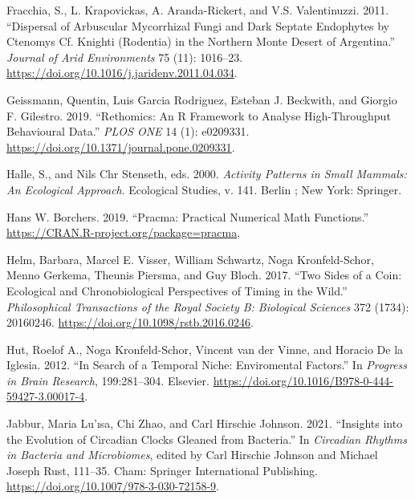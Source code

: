 \documentclass[msc,numbers,hidelinks]{coppe}
\newlength{\cslhangindent}
\newenvironment{CSLReferences}[2] %
 {%
  \setlength{\parindent}{0pt}
  \ifodd #1 \everypar{\setlength{\hangindent}{\cslhangindent}}\ignorespaces\fi
  \ifnum #2 > 0
  \setlength{\parskip}{#2\baselineskip}
  \fi
 }%
 {}
\begin{document}
\begin{CSLReferences}{1}{0}
  \leavevmode{}%
  Fracchia, S., L. Krapovickas, A. Aranda-Rickert, and V.S. Valentinuzzi. 2011. {``Dispersal of Arbuscular Mycorrhizal Fungi and Dark Septate Endophytes by Ctenomys Cf. Knighti (Rodentia) in the Northern Monte Desert of Argentina.''} \emph{Journal of Arid Environments} 75 (11): 1016--23. \url{https://doi.org/10.1016/j.jaridenv.2011.04.034}.

  \leavevmode{}%
  Geissmann, Quentin, Luis Garcia Rodriguez, Esteban J. Beckwith, and Giorgio F. Gilestro. 2019. {``Rethomics: An {R} Framework to Analyse High-Throughput Behavioural Data.''} \emph{PLOS ONE} 14 (1): e0209331. \url{https://doi.org/10.1371/journal.pone.0209331}.

  \leavevmode{}%
  Halle, S., and Nils Chr Stenseth, eds. 2000. \emph{Activity Patterns in Small Mammals: An Ecological Approach}. Ecological Studies, v. 141. {Berlin ; New York}: {Springer}.

  \leavevmode{}%
  Hans W. Borchers. 2019. {``Pracma: Practical Numerical Math Functions.''} \url{https://CRAN.R-project.org/package=pracma}.

  \leavevmode{}%
  Helm, Barbara, Marcel E. Visser, William Schwartz, Noga Kronfeld-Schor, Menno Gerkema, Theunis Piersma, and Guy Bloch. 2017. {``Two Sides of a Coin: Ecological and Chronobiological Perspectives of Timing in the Wild.''} \emph{Philosophical Transactions of the Royal Society B: Biological Sciences} 372 (1734): 20160246. \url{https://doi.org/10.1098/rstb.2016.0246}.

  \leavevmode{}%
  Hut, Roelof A., Noga Kronfeld-Schor, Vincent van der Vinne, and Horacio De la Iglesia. 2012. {``In Search of a Temporal Niche: {Enviromental Factors}.''} In \emph{Progress in {Brain Research}}, 199:281--304. {Elsevier}. \url{https://doi.org/10.1016/B978-0-444-59427-3.00017-4}.

  \leavevmode{}%
  Jabbur, Maria Lu'ısa, Chi Zhao, and Carl Hirschie Johnson. 2021. {``Insights into the Evolution of Circadian Clocks Gleaned from Bacteria.''} In \emph{Circadian Rhythms in Bacteria and Microbiomes}, edited by Carl Hirschie Johnson and Michael Joseph Rust, 111--35. {Cham}: {Springer International Publishing}. \url{https://doi.org/10.1007/978-3-030-72158-9}.


\end{CSLReferences}
\end{document}
